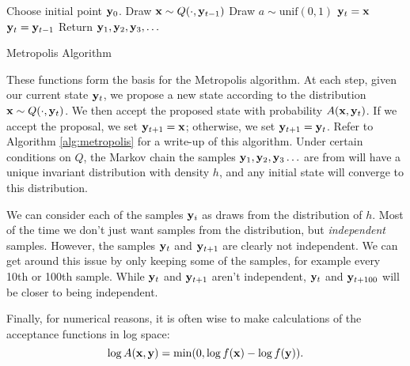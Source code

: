 \begin{algorithm}
\begin{algorithmic}[1]
    \State \textrm{Choose initial point } $\mathbf{y}_0$.
        \State \textrm{Draw } $\mathbf{x} \sim Q(\cdot, \mathbf{y}_{t-1})$
        \State \textrm{Draw } $a \sim \text{unif}(0,1)$
            \State $\mathbf{y}_t = \mathbf{x}$
        \Else
            \State $\mathbf{y}_t = \mathbf{y}_{t-1}$
        \EndIf
    \EndFor
    \State \textrm{Return } $\mathbf{y}_1,\mathbf{y}_2,\mathbf{y}_3,\ldots$
\EndProcedure
\end{algorithmic}
\caption{Metropolis Algorithm}
\label{alg:metropolis}
\end{algorithm}
These functions form the basis for the Metropolis algorithm.
At each step, given our current state $\mathbf{y}_t$, we propose a new state according to the distribution $\mathbf{x}\sim Q(\cdot, \mathbf{y}_t)$. 
We then accept the proposed state with probability $A(\mathbf{x}, \mathbf{y}_t)$.
If we accept the proposal, we set $\mathbf{y}_{t+1}=\mathbf{x}$; otherwise, we set $\mathbf{y}_{t+1}=\mathbf{y}_t$.
Refer to Algorithm \ref{alg:metropolis} for a write-up of this algorithm.
Under certain conditions on $Q$, the Markov chain the samples $\mathbf{y}_1,\mathbf{y}_2,\mathbf{y}_3\ldots$ are from will have a unique invariant distribution with density $h$, and any initial state will converge to this distribution.

We can consider each of the samples $\mathbf{y}_i$ as draws from the distribution of $h$.
Most of the time we don't just want samples from the distribution, but \emph{independent} samples.
However, the samples $\mathbf{y}_t$ and $\mathbf{y}_{t+1}$ are clearly not independent.
We can get around this issue by only keeping some of the samples, for example every 10th or 100th sample.
While $\mathbf{y}_t$ and $\mathbf{y}_{t+1}$ aren't independent, $\mathbf{y}_t$ and $\mathbf{y}_{t+100}$ will be closer to being independent.

Finally, for numerical reasons, it is often wise to make calculations of the acceptance functions in log space:
\[
\log A(\mathbf{x},\mathbf{y}) = \min(0, \log f(\mathbf{x}) - \log f(\mathbf{y})).
\]


